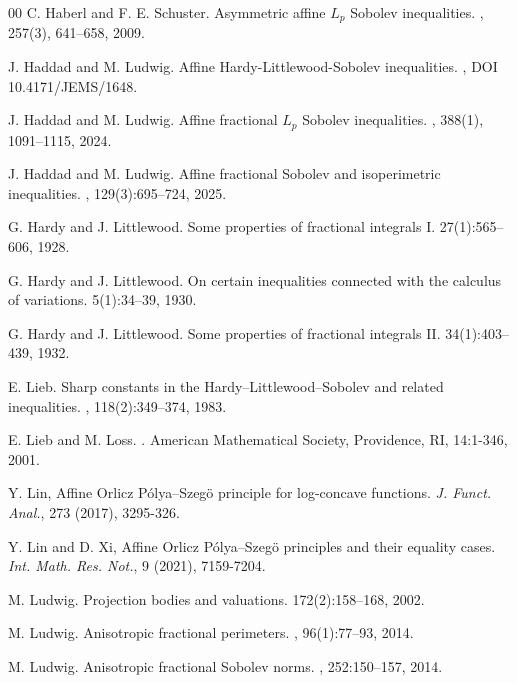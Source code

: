 \documentclass[preprint,12pt]{elsarticle}
\begin{document}
\begin{thebibliography}{00}
C. Haberl and F. E. Schuster.
\newblock Asymmetric affine ${L}_{p}$ Sobolev inequalities.
,
257(3), 641--658, 2009.
		
J. Haddad and M. Ludwig.
\newblock Affine Hardy-Littlewood-Sobolev inequalities.
,  DOI 10.4171/JEMS/1648.
		
J. Haddad and M. Ludwig.
\newblock Affine fractional ${L}_{p}$ Sobolev inequalities.
,
388(1), 1091--1115, 2024.
		
J. Haddad and M. Ludwig.
\newblock Affine fractional Sobolev and isoperimetric inequalities.
,
129(3):695--724, 2025.
		
G. Hardy and J. Littlewood.
\newblock Some properties of fractional integrals I.
27(1):565--606, 1928.
		
G. Hardy and J. Littlewood.
\newblock On certain inequalities connected with the calculus of variations.
5(1):34--39, 1930.
		
G. Hardy and J. Littlewood.
\newblock Some properties of fractional integrals II.
34(1):403--439, 1932.
		
E. Lieb.
\newblock Sharp constants in the Hardy–Littlewood–Sobolev and related inequalities.
,
118(2):349--374, 1983.
			
E. Lieb and M. Loss.
.
\newblock American Mathematical Society, Providence, RI, 14:1-346, 2001.
	

Y. Lin, Affine Orlicz P\'olya–Szeg\"o principle for log-concave functions. {\em J. Funct. Anal.}, 273 (2017), 3295-326.

Y. Lin and D. Xi, Affine Orlicz P\'olya–Szeg\"o principles and their equality cases. {\em Int. Math. Res. Not.}, 9 (2021), 7159-7204.

	
M. Ludwig.
\newblock Projection bodies and valuations.
172(2):158--168, 2002.
		
M. Ludwig.
\newblock Anisotropic fractional perimeters.
,
96(1):77--93, 2014.
		
M. Ludwig.
\newblock Anisotropic fractional Sobolev norms.
,
252:150--157, 2014.
		

\end{thebibliography}
\end{document}
